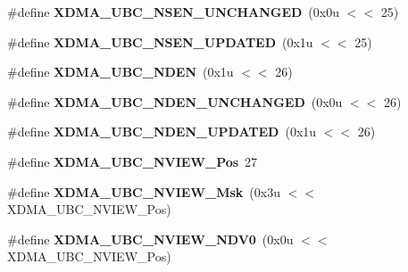 \begin{DoxyCompactItemize}
\item 
\mbox{\label{group__dmad__defines_ga654331ef289c60740f84aca7ec60e9c6}} 
\#define {\bfseries X\+D\+M\+A\+\_\+\+U\+B\+C\+\_\+\+N\+S\+E\+N\+\_\+\+U\+N\+C\+H\+A\+N\+G\+ED}~(0x0u $<$$<$ 25)
\item 
\mbox{\label{group__dmad__defines_ga48cff7f7a163860a216a8d615ce2d12f}} 
\#define {\bfseries X\+D\+M\+A\+\_\+\+U\+B\+C\+\_\+\+N\+S\+E\+N\+\_\+\+U\+P\+D\+A\+T\+ED}~(0x1u $<$$<$ 25)
\item 
\mbox{\label{group__dmad__defines_ga1e07477ddb2b26fad6e4d17453227604}} 
\#define {\bfseries X\+D\+M\+A\+\_\+\+U\+B\+C\+\_\+\+N\+D\+EN}~(0x1u $<$$<$ 26)
\item 
\mbox{\label{group__dmad__defines_ga7654ffc49a12ed40e04f696e15b4c060}} 
\#define {\bfseries X\+D\+M\+A\+\_\+\+U\+B\+C\+\_\+\+N\+D\+E\+N\+\_\+\+U\+N\+C\+H\+A\+N\+G\+ED}~(0x0u $<$$<$ 26)
\item 
\mbox{\label{group__dmad__defines_ga486b29d106674b4b6be5982f5dba04f4}} 
\#define {\bfseries X\+D\+M\+A\+\_\+\+U\+B\+C\+\_\+\+N\+D\+E\+N\+\_\+\+U\+P\+D\+A\+T\+ED}~(0x1u $<$$<$ 26)
\item 
\mbox{\label{group__dmad__defines_gac45c9a65da51aa09290018f719f537b5}} 
\#define {\bfseries X\+D\+M\+A\+\_\+\+U\+B\+C\+\_\+\+N\+V\+I\+E\+W\+\_\+\+Pos}~27
\item 
\mbox{\label{group__dmad__defines_ga2e6a1dcc1057328277011aa8015056d5}} 
\#define {\bfseries X\+D\+M\+A\+\_\+\+U\+B\+C\+\_\+\+N\+V\+I\+E\+W\+\_\+\+Msk}~(0x3u $<$$<$ X\+D\+M\+A\+\_\+\+U\+B\+C\+\_\+\+N\+V\+I\+E\+W\+\_\+\+Pos)
\item 
\mbox{\label{group__dmad__defines_ga350c4b813d69213f660f0d48241a0669}} 
\#define {\bfseries X\+D\+M\+A\+\_\+\+U\+B\+C\+\_\+\+N\+V\+I\+E\+W\+\_\+\+N\+D\+V0}~(0x0u $<$$<$ X\+D\+M\+A\+\_\+\+U\+B\+C\+\_\+\+N\+V\+I\+E\+W\+\_\+\+Pos)
\item 
\mbox{\label{group__dmad__defines_ga2d8580b229d3f2c29df8c0943c8c7553}} 
$$
\end{DoxyCompactItemize}

